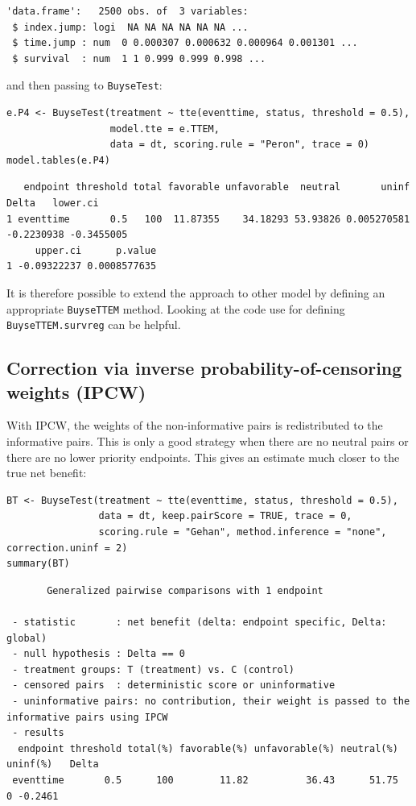 \documentclass[12pt]{article}
\begin{document}
\begin{verbatim}
'data.frame':	2500 obs. of  3 variables:
 $ index.jump: logi  NA NA NA NA NA NA ...
 $ time.jump : num  0 0.000307 0.000632 0.000964 0.001301 ...
 $ survival  : num  1 1 0.999 0.999 0.998 ...
\end{verbatim}


and then passing to \texttt{BuyseTest}:
\lstset{language=r,label= ,caption= ,captionpos=b,numbers=none}
\begin{lstlisting}
e.P4 <- BuyseTest(treatment ~ tte(eventtime, status, threshold = 0.5),
                  model.tte = e.TTEM,
                  data = dt, scoring.rule = "Peron", trace = 0)
model.tables(e.P4)
\end{lstlisting}

\begin{verbatim}
   endpoint threshold total favorable unfavorable  neutral       uninf      Delta   lower.ci
1 eventtime       0.5   100  11.87355    34.18293 53.93826 0.005270581 -0.2230938 -0.3455005
     upper.ci      p.value
1 -0.09322237 0.0008577635
\end{verbatim}


It is therefore possible to extend the approach to other model by
defining an appropriate \texttt{BuyseTTEM} method. Looking at the code use
for defining \texttt{BuyseTTEM.survreg} can be helpful.

\subsection{Correction via inverse probability-of-censoring weights (IPCW)}
\label{sec:org10f15f7}

With IPCW, the weights of the non-informative pairs is redistributed
to the informative pairs. This is only a good strategy when there are
no neutral pairs or there are no lower priority endpoints. This gives
an estimate much closer to the true net benefit:
\lstset{language=r,label= ,caption= ,captionpos=b,numbers=none}
\begin{lstlisting}
BT <- BuyseTest(treatment ~ tte(eventtime, status, threshold = 0.5),
                data = dt, keep.pairScore = TRUE, trace = 0,
                scoring.rule = "Gehan", method.inference = "none", correction.uninf = 2)
summary(BT)
\end{lstlisting}

\begin{verbatim}
       Generalized pairwise comparisons with 1 endpoint

 - statistic       : net benefit (delta: endpoint specific, Delta: global) 
 - null hypothesis : Delta == 0 
 - treatment groups: T (treatment) vs. C (control) 
 - censored pairs  : deterministic score or uninformative
 - uninformative pairs: no contribution, their weight is passed to the informative pairs using IPCW
 - results
  endpoint threshold total(%) favorable(%) unfavorable(%) neutral(%) uninf(%)   Delta
 eventtime       0.5      100        11.82          36.43      51.75        0 -0.2461
\end{verbatim}
\end{document}
